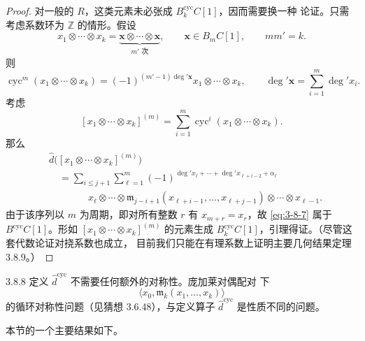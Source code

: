 \begin{proof}
对一般的 $R$，这类元素未必张成 $B_k^{\mathrm{cyc}}C[1]$，因而需要换一种
论证。只需考虑系数环为 $\mathbb Z$ 的情形。假设
\[
 x_1\otimes\cdots\otimes x_k
 =
 \underbrace{\mathbf x\otimes\cdots\otimes\mathbf x}_{m'\text{ 次}},
 \qquad
 \mathbf x\in B_mC[1],
 \qquad
 mm'=k.
\]
则
\[
 \operatorname{cyc}^{m}(x_1\otimes\cdots\otimes x_k)
 =
 (-1)^{(m'-1)\deg'\mathbf x}
 x_1\otimes\cdots\otimes x_k,
 \qquad
 \deg'\mathbf x=\sum_{i=1}^{m}\deg' x_i.
\]
考虑
\[
 [x_1\otimes\cdots\otimes x_k]^{(m)}
 =
 \sum_{i=1}^{m}
 \operatorname{cyc}^{i}(x_1\otimes\cdots\otimes x_k).
\]
那么
\begin{equation}
\begin{aligned}
 &\widehat d\bigl([x_1\otimes\cdots\otimes x_k]^{(m)}\bigr)\\
 &\quad=
 \sum_{i\leq j+1}\sum_{\ell=1}^{m}
 (-1)^{
  \deg' x_\ell+\cdots+\deg' x_{\ell+i-2}+\alpha_\ell}\\
 &\qquad\qquad
 x_\ell\otimes\cdots\otimes
 \mathfrak m_{j-i+1}
 (x_{\ell+i-1},\ldots,x_{\ell+j-1})
 \otimes\cdots\otimes x_{\ell-1}.
\end{aligned}
\tag{3.8.7}\label{eq:3-8-7}
\end{equation}
由于该序列以 $m$ 为周期，即对所有整数 $r$ 有
$x_{m+r}=x_r$，故 \eqref{eq:3-8-7} 属于
$B^{\mathrm{cyc}}C[1]$。形如
$[x_1\otimes\cdots\otimes x_k]^{(m)}$ 的元素生成
$B_k^{\mathrm{cyc}}C[1]$，引理得证。（尽管这套代数论证对挠系数也成立，
目前我们只能在有理系数上证明主要几何结果定理 3.8.9。）
\end{proof}

\begin{remark}{3.8.8}\label{rem:3-8-8}
定义 $\widehat d^{\mathrm{cyc}}$ 不需要任何额外的对称性。庞加莱对偶配对
下
\[
 \bigl\langle x_0,\mathfrak m_k(x_1,\ldots,x_k)\bigr\rangle
\]
的循环对称性问题（见猜想 3.6.48），与定义算子
$\widehat d^{\mathrm{cyc}}$ 是性质不同的问题。
\end{remark}

本节的一个主要结果如下。

